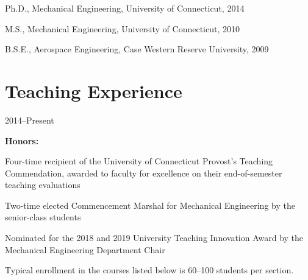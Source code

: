 Ph.D., Mechanical Engineering, University of Connecticut, 2014

M.S., Mechanical Engineering, University of Connecticut, 2010

B.S.E., Aerospace Engineering, Case Western Reserve University, 2009

\section{{\sectionfont{} Teaching Experience}}

 \hfill 2014--Present

\textbf{Honors:}

\begin{innerlist}
    \item Four-time recipient of the University of Connecticut Provost's Teaching Commendation, awarded to faculty for excellence on their end-of-semester teaching evaluations
    \item Two-time elected Commencement Marshal for Mechanical Engineering by the senior-class students
    \item Nominated for the 2018 and 2019 University Teaching Innovation Award by the Mechanical Engineering Department Chair
\end{innerlist}
\vspace{0.5\baselineskip}
Typical enrollment in the courses listed below is 60--100 students per section.
